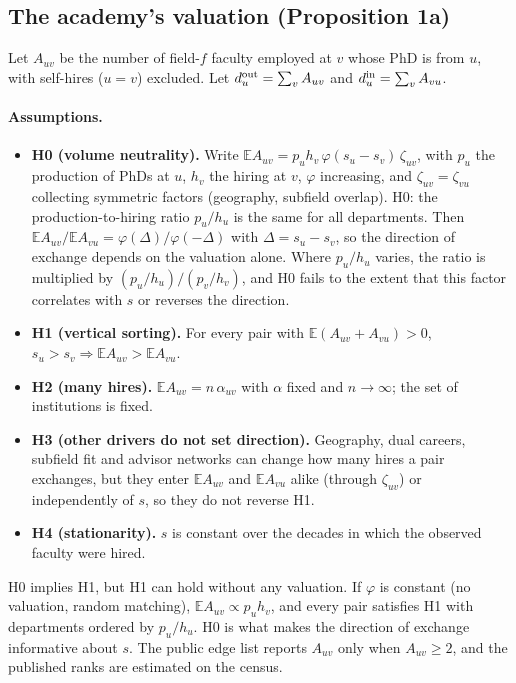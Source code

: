 \documentclass[11pt]{article}
\begin{document}
\subsection{The academy's valuation (Proposition 1a)}\label{si:theory:academy}

Let $A_{uv}$ be the number of field-$f$ faculty employed at $v$ whose PhD is from $u$, with self-hires ($u=v$)
excluded. Let $d^{\rm out}_u=\sum_vA_{uv}$ and $d^{\rm in}_u=\sum_vA_{vu}$.

\paragraph{Assumptions.}
\begin{itemize}
\item \textbf{H0 (volume neutrality).} Write $\mathbb E A_{uv}=p_uh_v\,\varphi(s_u-s_v)\,\zeta_{uv}$, with $p_u$
the production of PhDs at $u$, $h_v$ the hiring at $v$, $\varphi$ increasing, and $\zeta_{uv}=\zeta_{vu}$
collecting symmetric factors (geography, subfield overlap). H0: the production-to-hiring ratio $p_u/h_u$ is the
same for all departments. Then $\mathbb E A_{uv}/\mathbb E A_{vu}=\varphi(\Delta)/\varphi(-\Delta)$ with
$\Delta=s_u-s_v$, so the direction of exchange depends on the valuation alone. Where $p_u/h_u$ varies, the ratio
is multiplied by $(p_u/h_u)/(p_v/h_v)$, and H0 fails to the extent that this factor correlates with $s$ or reverses
the direction.
\item \textbf{H1 (vertical sorting).} For every pair with $\mathbb E(A_{uv}+A_{vu})>0$,
$s_u>s_v\Rightarrow\mathbb E A_{uv}>\mathbb E A_{vu}$.
\item \textbf{H2 (many hires).} $\mathbb E A_{uv}=n\,\alpha_{uv}$ with $\alpha$ fixed and $n\to\infty$; the set
of institutions is fixed.
\item \textbf{H3 (other drivers do not set direction).} Geography, dual careers, subfield fit and advisor networks
can change how many hires a pair exchanges, but they enter $\mathbb E A_{uv}$ and $\mathbb E A_{vu}$ alike
(through $\zeta_{uv}$) or independently of $s$, so they do not reverse H1.
\item \textbf{H4 (stationarity).} $s$ is constant over the decades in which the observed faculty were hired.
\end{itemize}
H0 implies H1, but H1 can hold without any valuation. If $\varphi$ is constant
(no valuation, random matching), $\mathbb E A_{uv}\propto p_uh_v$, and every pair satisfies H1 with departments
ordered by $p_u/h_u$. H0 is what makes the direction of exchange informative about $s$. The public edge list
reports $A_{uv}$ only when $A_{uv}\ge2$, and the published ranks are estimated on the census.
\end{document}
